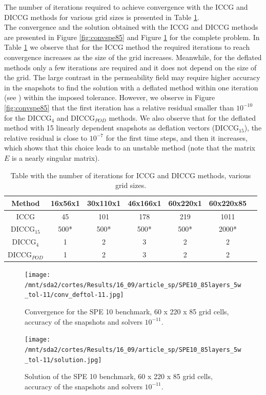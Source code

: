 \documentclass[12pt]{article}
\begin{document}
The number of iterations required to achieve convergence with the ICCG and DICCG methods for various grid sizes is presented in Table \ref{table:itgrid}. \\
The convergence and the solution obtained with the ICCG and DICCG methods are presented in Figure \ref{fig:convspe85} and Figure \ref{fig:solspe} for the complete problem. 
In Table \ref{table:itgrid} we observe that for the ICCG method the required iterations to reach convergence increases as the size of the grid increases. Meanwhile, for the deflated methods only a few iterations are required and it does not depend on the size of the grid. The large contrast in the permeability field may require higher accuracy in the snapshots to find the solution with a deflated method within one iteration (see \cite{Diaz16}) within the imposed tolerance. However, we observe in Figure \ref{fig:convspe85} that the first iteration has a relative residual smaller than $10^{-10}$ for the DICCG$_4$ and DICCG$_{POD}$ methods.
We also observe that for the deflated method with 15 linearly dependent snapshots as deflation vectors (DICCG$_{15}$), the relative residual is close to $10^{-7}$ for the first time steps, and then it increases, which shows that this choice leads to an unstable method (note that the matrix $E$ is a nearly singular matrix). 

\begin{table}[!ht]
\centering
\begin{tabular}{|c |c|c|c|c|c| c| } 
 \hline
Method  & 16x56x1& 30x110x1& 46x166x1& 60x220x1&60x220x85\\
   \hline
  ICCG & 45 & 101&  178 &  219&1011 \\ 
   DICCG$_{15}$ & 500* & 500*&  500* &  500*& 2000*\\ 
   DICCG$_{4}$ & 1 & 2&  3 &  2& 2\\  
   DICCG$_{POD}$ & 1 & 2&  3 &  2 &2\\ 
\hline
\end{tabular}
\caption{Table with the number of iterations for ICCG and DICCG methods, 
various grid sizes.}
\label{table:itgrid}
\end{table}

\begin{figure}[!h]
\centering
\begin{minipage}{.5\textwidth}
 \centering
\texttt{[image: /mnt/sda2/cortes/Results/16\_09/article\_sp/SPE10\_85layers\_5w\_tol-11/conv\_deftol-11.jpg]}
\caption{Convergence for the SPE 10 benchmark, 60 x 220 x 85 grid cells, accuracy of the snapshots and solvers $10 ^{-11}$.}
\label{fig:convspe85}
\end{minipage}%
\hspace{3mm}
\begin{minipage}{.45\textwidth}
 \centering
\texttt{[image: /mnt/sda2/cortes/Results/16\_09/article\_sp/SPE10\_85layers\_5w\_tol-11/solution.jpg]}
\vspace{.7cm}
\caption{Solution of the SPE 10 benchmark, 60 x 220 x 85 grid cells, accuracy of the snapshots and solvers $10 ^{-11}$.}
\label{fig:solspe}
\end{minipage}
\end{figure}
\clearpage 
\end{document}
